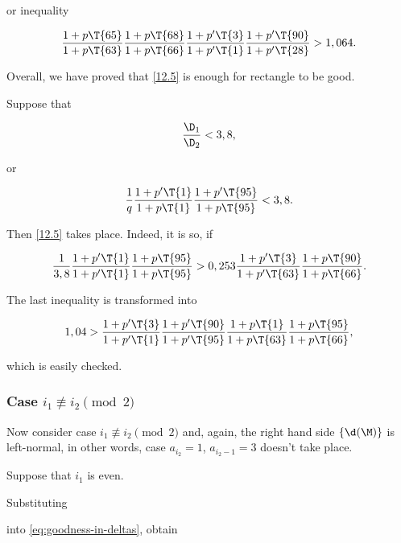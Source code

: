 or inequality

\begin{equation*}
	\dfrac{1 + p \T{65}}{1 + p \T{63}}
	\dfrac{1 + p \T{68}}{1 + p \T{66}}
	\dfrac{1 + p' \T{3}}{1 + p' \T{1}}
	\dfrac{1 + p' \T{90}}{1 + p' \T{28}}
	>
	1,064.
\end{equation*}

Overall, we have proved that \ref{12.5} is enough for rectangle to be good.

Suppose that

\begin{equation}\label{goodness_condition_3,8}
	\dfrac{\D_1}{\D_2} < 3,8,
\end{equation}

or

\begin{equation*}
	\dfrac{1}{q}
	\dfrac{1 + p' \T{1}}{1 + p \T{1}}
	\dfrac{1 + p' \T{95}}{1 + p \T{95}}
	<
	3,8.
\end{equation*}

Then \ref{12.5} takes place. Indeed, it is so, if

\begin{equation*}
	\dfrac{1}{3,8}
	\dfrac{1 + p' \T{1}}{1 + p' \T{1}}
	\dfrac{1 + p \T{95}}{1 + p \T{95}}
	>
	0,253
	\dfrac{1 + p' \T{3}}{1 + p' \T{63}}
	\dfrac{1 + p \T{90}}{1 + p \T{66}}.
\end{equation*}

The last inequality is transformed into

\begin{equation*}
	1,04
	>
	\dfrac{1 + p' \T{3}}{1 + p' \T{1}}
	\dfrac{1 + p' \T{90}}{1 + p' \T{95}}
	\dfrac{1 + p \T{1}}{1 + p \T{63}}
	\dfrac{1 + p \T{95}}{1 + p \T{66}},
\end{equation*}

which is easily checked.

\subsubsection{Case $i_1 \not\equiv i_2 \pmod 2$}

Now consider case $i_1 \not\equiv i_2 \pmod 2$
and, again, the right hand side $\{\d(\M)\}$ is left-normal,
in other words, case $a_{i_2} = 1$, $a_{i_2 - 1} = 3$
doesn't take place.

Suppose that $i_1$ is even.


Substituting

into \ref{eq:goodness-in-deltas}, obtain

